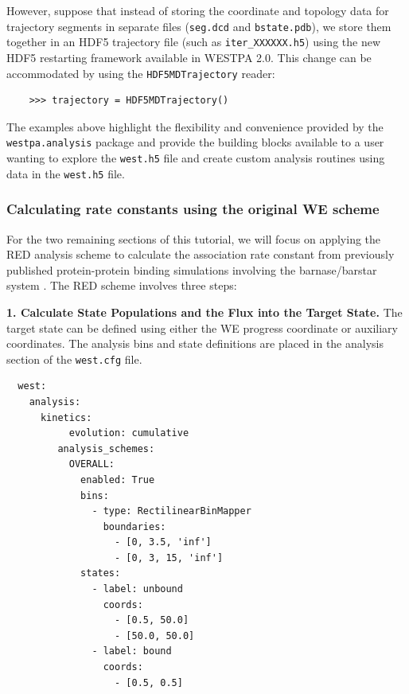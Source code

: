 However, suppose that instead of storing the coordinate and topology data for trajectory segments in separate files (\verb|seg.dcd| and \verb|bstate.pdb|), we store them together in an HDF5 trajectory file (such as \verb|iter_XXXXXX.h5|) using the new HDF5 restarting framework available in WESTPA 2.0. This change can be accommodated by using the \verb|HDF5MDTrajectory| reader:

\begin{verbatim}
    >>> trajectory = HDF5MDTrajectory()
\end{verbatim}

The examples above highlight the flexibility and convenience provided by the \verb|westpa.analysis| package and provide the building blocks available to a user wanting to explore the \verb|west.h5| file and create custom analysis routines using data in the \verb|west.h5| file.

\subsubsection{Calculating rate constants using the original WE scheme}

For the two remaining sections of this tutorial, we will focus on applying the RED analysis scheme \citep{degrave_red_2021} to calculate the association rate constant from previously published protein-protein binding simulations involving the barnase/barstar system \citep{saglam_proteinprotein_2019}.
The RED scheme involves three steps:

\textbf{1. Calculate State Populations and the Flux into the Target State.} The target state can be defined using either the WE progress coordinate or auxiliary coordinates.
The analysis bins and state definitions are placed in the analysis section of the \verb|west.cfg| file.

\begin{verbatim}
  west:
    analysis:
      kinetics:
           evolution: cumulative
         analysis_schemes:                  
           OVERALL:
             enabled: True
             bins:
               - type: RectilinearBinMapper
                 boundaries:
                   - [0, 3.5, 'inf']  
                   - [0, 3, 15, 'inf']
             states:
               - label: unbound
                 coords:
                   - [0.5, 50.0]
                   - [50.0, 50.0]
               - label: bound
                 coords: 
                   - [0.5, 0.5]
\end{verbatim}

